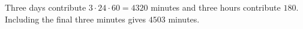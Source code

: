 Three days contribute $3\cdot24\cdot60=4320$ minutes and three hours contribute $180$. Including the final three minutes gives $\boxed{4503}$ minutes.
